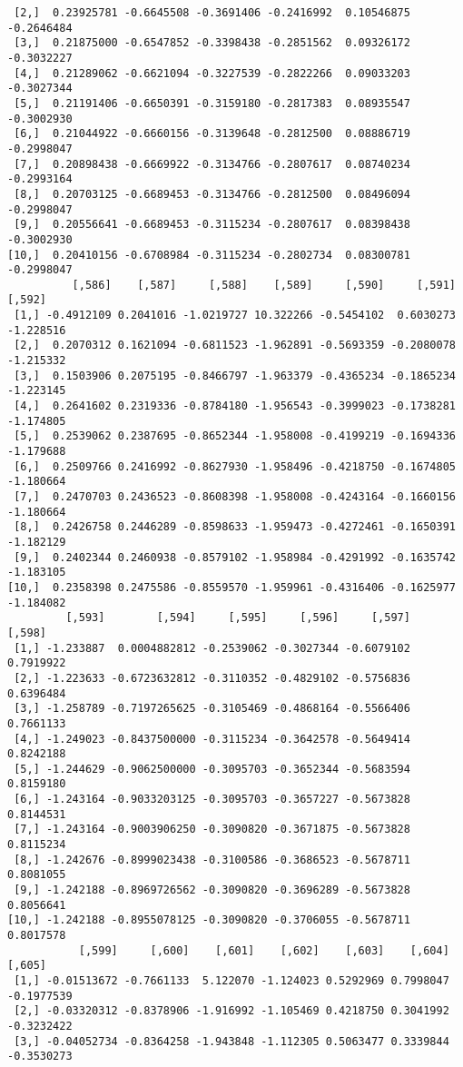 \documentclass[
  letterpaper,
  DIV=11,
  numbers=noendperiod]{scrreprt}
\begin{document}
\begin{verbatim}
 [2,]  0.23925781 -0.6645508 -0.3691406 -0.2416992  0.10546875 -0.2646484
 [3,]  0.21875000 -0.6547852 -0.3398438 -0.2851562  0.09326172 -0.3032227
 [4,]  0.21289062 -0.6621094 -0.3227539 -0.2822266  0.09033203 -0.3027344
 [5,]  0.21191406 -0.6650391 -0.3159180 -0.2817383  0.08935547 -0.3002930
 [6,]  0.21044922 -0.6660156 -0.3139648 -0.2812500  0.08886719 -0.2998047
 [7,]  0.20898438 -0.6669922 -0.3134766 -0.2807617  0.08740234 -0.2993164
 [8,]  0.20703125 -0.6689453 -0.3134766 -0.2812500  0.08496094 -0.2998047
 [9,]  0.20556641 -0.6689453 -0.3115234 -0.2807617  0.08398438 -0.3002930
[10,]  0.20410156 -0.6708984 -0.3115234 -0.2802734  0.08300781 -0.2998047
          [,586]    [,587]     [,588]    [,589]     [,590]     [,591]    [,592]
 [1,] -0.4912109 0.2041016 -1.0219727 10.322266 -0.5454102  0.6030273 -1.228516
 [2,]  0.2070312 0.1621094 -0.6811523 -1.962891 -0.5693359 -0.2080078 -1.215332
 [3,]  0.1503906 0.2075195 -0.8466797 -1.963379 -0.4365234 -0.1865234 -1.223145
 [4,]  0.2641602 0.2319336 -0.8784180 -1.956543 -0.3999023 -0.1738281 -1.174805
 [5,]  0.2539062 0.2387695 -0.8652344 -1.958008 -0.4199219 -0.1694336 -1.179688
 [6,]  0.2509766 0.2416992 -0.8627930 -1.958496 -0.4218750 -0.1674805 -1.180664
 [7,]  0.2470703 0.2436523 -0.8608398 -1.958008 -0.4243164 -0.1660156 -1.180664
 [8,]  0.2426758 0.2446289 -0.8598633 -1.959473 -0.4272461 -0.1650391 -1.182129
 [9,]  0.2402344 0.2460938 -0.8579102 -1.958984 -0.4291992 -0.1635742 -1.183105
[10,]  0.2358398 0.2475586 -0.8559570 -1.959961 -0.4316406 -0.1625977 -1.184082
         [,593]        [,594]     [,595]     [,596]     [,597]    [,598]
 [1,] -1.233887  0.0004882812 -0.2539062 -0.3027344 -0.6079102 0.7919922
 [2,] -1.223633 -0.6723632812 -0.3110352 -0.4829102 -0.5756836 0.6396484
 [3,] -1.258789 -0.7197265625 -0.3105469 -0.4868164 -0.5566406 0.7661133
 [4,] -1.249023 -0.8437500000 -0.3115234 -0.3642578 -0.5649414 0.8242188
 [5,] -1.244629 -0.9062500000 -0.3095703 -0.3652344 -0.5683594 0.8159180
 [6,] -1.243164 -0.9033203125 -0.3095703 -0.3657227 -0.5673828 0.8144531
 [7,] -1.243164 -0.9003906250 -0.3090820 -0.3671875 -0.5673828 0.8115234
 [8,] -1.242676 -0.8999023438 -0.3100586 -0.3686523 -0.5678711 0.8081055
 [9,] -1.242188 -0.8969726562 -0.3090820 -0.3696289 -0.5673828 0.8056641
[10,] -1.242188 -0.8955078125 -0.3090820 -0.3706055 -0.5678711 0.8017578
           [,599]     [,600]    [,601]    [,602]    [,603]    [,604]     [,605]
 [1,] -0.01513672 -0.7661133  5.122070 -1.124023 0.5292969 0.7998047 -0.1977539
 [2,] -0.03320312 -0.8378906 -1.916992 -1.105469 0.4218750 0.3041992 -0.3232422
 [3,] -0.04052734 -0.8364258 -1.943848 -1.112305 0.5063477 0.3339844 -0.3530273

\end{verbatim}
\end{document}
